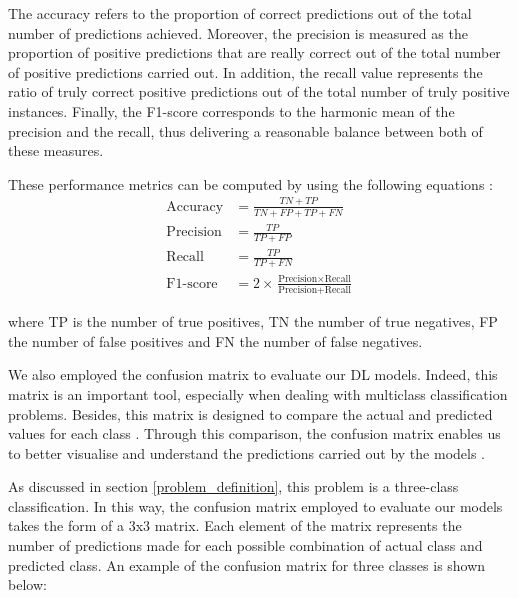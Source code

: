 \documentclass[12pt,oneside]{book} %
\begin{document}
\noindent The accuracy \cite{Klu} refers to the proportion of correct predictions out of the total number of predictions achieved. Moreover, the precision \cite{Klu} is measured as the proportion of positive predictions that are really correct out of the total number of positive predictions carried out. In addition, the recall \cite{Klu} value represents the ratio of truly correct positive predictions out of the total number of truly positive instances. Finally, the F1-score \cite{Klu} corresponds to the harmonic mean of the precision and the recall, thus delivering a reasonable balance between both of these measures.

\noindent These performance metrics can be computed by using the following equations \cite{Harikri}:
\begin{align}
\text{Accuracy} &= \frac{TN + TP}{TN + FP + TP + FN} \\ 
\text{Precision} &= \frac{TP}{TP + FP}\\
\text{Recall} &= \frac{TP}{TP + FN} \\ 
\text{F1-score} &= 2 \times \frac{\text{Precision} \times \text{Recall}}{\text{Precision} + \text{Recall}}
\end{align}

\noindent where TP is the number of true positives, TN the number of true negatives, FP the number of false positives and FN the number of false negatives.

\noindent We also employed the confusion matrix to evaluate our DL models. Indeed, this matrix is an important tool, especially when dealing with multiclass classification problems. Besides, this matrix is designed to compare the actual and predicted values for each class \cite{Confusion_matrix2}. Through this comparison, the confusion matrix enables us to better visualise and understand the predictions carried out by the models \cite{Confusion_matrix1}.

\noindent As discussed in section \ref{problem_definition}, this problem is a three-class classification. In this way, the confusion matrix employed to evaluate our models takes the form of a 3x3 matrix. Each element of the matrix represents the number of predictions made for each possible combination of actual class and predicted class. An example of the confusion matrix for three classes is shown below:
\end{document}
